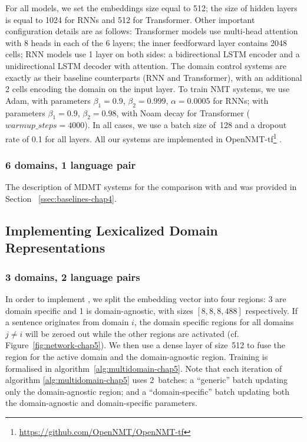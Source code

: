 For all models, we set the embeddings size equal to 512; the size of hidden layers is equal to 1024 for RNNs and 512 for Transformer. 
Other important configuration details are as follows:
Transformer models use multi-head attention with 8 heads in each of the 6 layers; 
the inner feedforward layer contains 2048 cells;  
RNN models use 1 layer on both sides: 
a bidirectional LSTM encoder and a unidirectional LSTM decoder with attention.
The domain control systems are exactly as their baseline counterparts (RNN and Transformer), with an additional 2 cells encoding the domain on the input layer.
To train NMT systems, we use Adam, with parameters $\beta_1=0.9$, $\beta_2 = 0.999$, $\alpha=0.0005$ for RNNs; with parameters $\beta_1=0.9$, $\beta_2= 0.98$, with Noam decay \citep{Vaswani17attention} for Transformer ($warmup\_steps=4000$). In all cases, we use a batch size of~128 and a dropout rate of 0.1 for all layers. 
All our systems are implemented in OpenNMT-tf\footnote{\url{https://github.com/OpenNMT/OpenNMT-tf}} \citep{Klein17opennmt}.
\subsubsection{6 domains, 1 language pair}
The description of MDMT systems for the comparison with  and  was provided in Section ~\ref{ssec:baselines-chap4}.

\subsection{Implementing Lexicalized Domain Representations}
\subsubsection{3 domains, 2 language pairs}
\label{sssec:ldr3domain-chap5}
In order to implement , we split the embedding vector into four regions: 3 are domain specific and 1 is domain-agnostic, with sizes $[8,8,8,488]$ respectively. If a sentence originates from domain $i$, the domain specific regions for all domains $j \neq i$ will be zeroed out while the other regions are activated (cf. Figure~\ref{fig:network-chap5}). 
We then use a dense layer of size~512 to fuse the region for the active domain and the domain-agnostic region. Training is formalised in algorithm~\ref{alg:multidomain-chap5}.
%
Note that each iteration of algorithm \ref{alg:multidomain-chap5} uses 2~batches: a ``generic'' batch updating only the domain-agnostic region; and a ``domain-specific'' batch updating both the domain-agnostic and domain-specific parameters. 

